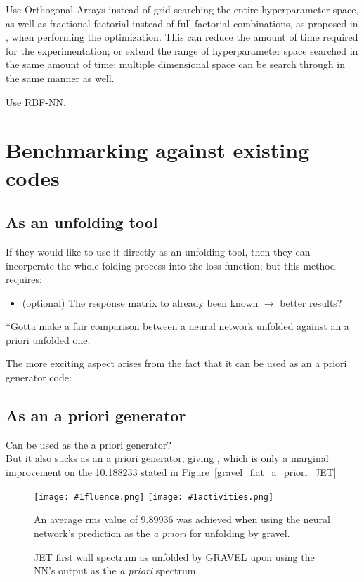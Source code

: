 \documentclass[a4paper, 12pt]{article}
\newcommand{\fluenceandactivities}[1]{
\texttt{[image: \#1fluence.png]}
\texttt{[image: \#1activities.png]}
}
\begin{document}
Use Orthogonal Arrays instead of grid searching the entire hyperparameter space, as well as fractional factorial instead of full factorial combinations, as proposed in \cite{RDANNM}, when performing the optimization. This can reduce the amount of time required for the experimentation; or extend the range of hyperparameter space searched in the same amount of time; multiple dimensional space can be search through in the same manner as well.

Use RBF-NN.

\section{Benchmarking against existing codes}
\subsection{As an unfolding tool}
If they would like to use it directly as an unfolding tool, then they can incorperate the whole folding process into the loss function; but this method requires:
\begin{itemize}
    \item (optional) The response matrix to already been known $\rightarrow$ better results?
\end{itemize}
*Gotta make a fair comparison between a neural network unfolded against an a priori unfolded one.

The more exciting aspect arises from the fact that it can be used as an a priori generator code:
\subsection{As an a priori generator}
Can be used as the a priori generator?\\
But it also sucks as an a priori generator, giving , which is only a marginal improvement on the 10.188233 stated in Figure~\ref{gravel_flat_a_priori_JET}
\begin{figure}
    \centering
    \fluenceandactivities{/home/ocean/Documents/GitHubDir/unfolding/unfolding/unfoldingsuite/neuralnetwork/realinputEarlyStopping/comparison/real_fusion_test_gravel_nn_a_priori_test_001_}
    \caption{JET first wall spectrum as unfolded by GRAVEL upon using the NN's output as the \emph{a priori} spectrum.}\label{gravel_nn_a_priori_JET}
    An average rms value of 9.89936 was achieved when using the neural network's prediction as the \emph{a priori} for unfolding by gravel.
\end{figure}
\end{document}
